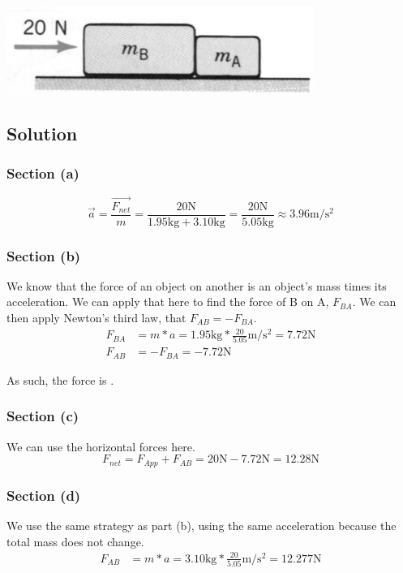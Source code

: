 \documentclass[12pt]{article}
\begin{document}
\begin{center}
    \includegraphics*[width=10cm]{graph_7.png}
\end{center}

\subsection*{Solution}
\subsubsection*{Section (a)}

\begin{equation*}
    \vec{a} = \frac{\vec{F_{net}}}{m} 
        = \frac{20\unit{\newton}}{1.95\unit{\kilo\gram} + 3.10\unit{\kilo\gram}} = \frac{20\unit{\newton}}{5.05\unit{\kilo\gram}} 
        \approx \boxed{ 3.96 \unit{\meter/\second^2} }
\end{equation*}

\subsubsection*{Section (b)}
We know that the force of an object on another is an object's mass times its acceleration. We can apply that here to find the force of B on A, $F_{BA}$. We can then apply Newton's third law, that $F_{AB} = -F_{BA}$.
\begin{align*}
    F_{BA} &= m*a = 1.95 \unit{\kilo\gram} * \frac{20}{5.05} \unit{\meter/\second^2}
        = 7.72 \unit{\newton}\\
    F_{AB} &= -F_{BA} = -7.72\unit{\newton}
\end{align*}

As such, the force is .

\subsubsection*{Section (c)}
We can use the horizontal forces here.
\[
    F_{net} = F_{App} + F_{AB} = 20\unit{\newton} - 7.72\unit{\newton}
            = \boxed{ 12.28 \unit{\newton} }
\]

\pagebreak
\subsubsection*{Section (d)}
We use the same strategy as part (b), using the same acceleration because the total mass does not change.
\begin{align*}
    F_{AB} &= m*a = 3.10 \unit{\kilo\gram} * \frac{20}{5.05} \unit{\meter/\second^2}
        = \boxed{ 12.277 \unit{\newton} }
\end{align*}
\end{document}
